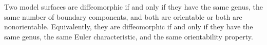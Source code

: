 Two model surfaces are diffeomorphic if and only if they have the same genus, the same number of boundary components, and both are orientable or both are nonorientable. Equivalently, they are diffeomorphic if and only if they have the same genus, the same Euler characteristic, and the same orientability property.
